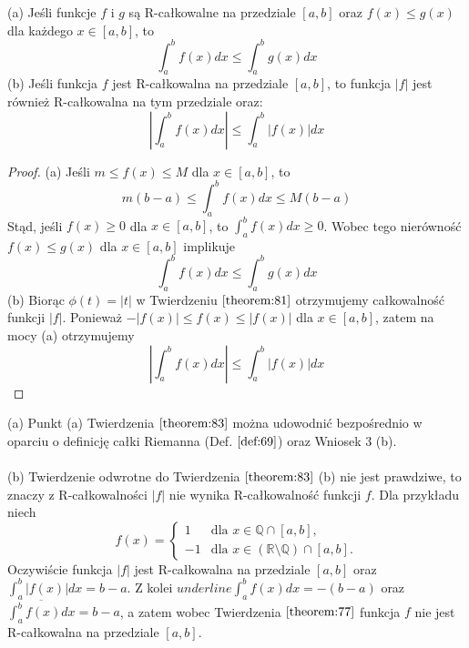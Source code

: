 \documentclass[leqno]{article}
\begin{document}
\begin{justify}
\begin{theorem} 
{
    (a) Jeśli funkcje $f$ i $g$ są R-całkowalne na przedziale $[a,b]$ oraz $f(x) \leqslant g(x)$ dla każdego $x \in [a,b]$, to
    \[
        \int_{a}^{b}f(x)dx \leqslant \int_{a}^{b}g(x)dx
    \]
    (b) Jeśli funkcja $f$ jest R-całkowalna na przedziale $[a,b]$, to funkcja $|f|$ jest również
    R-całkowalna na tym przedziale oraz:
    \[
        \left\vert\int_{a}^{b}f(x)dx\right\vert \leqslant \int_{a}^{b}|f(x)|dx
    \]
}
\end{theorem}
\begin{proof}
    (a) Jeśli $m \leqslant f(x) \leqslant M$ dla $x \in [a,b]$, to
    \[
        m(b-a) \leqslant \int_{a}^{b}f(x)dx \leqslant M(b-a)
    \]
    Stąd, jeśli $f(x) \geqslant 0$ dla $x \in [a,b]$, to $\int_{a}^{b}f(x)dx \geqslant 0$.
    Wobec tego nierówność $f(x) \leqslant g(x)$ dla $x \in [a,b]$ implikuje
    \[
        \int_{a}^{b}f(x)dx \leqslant \int_{a}^{b}g(x)dx
    \]
    (b) Biorąc $\phi(t) = |t|$ w Twierdzeniu $\ref{theorem:81}$ otrzymujemy całkowalność funkcji $|f|$.
    Ponieważ $-|f(x)| \leqslant f(x) \leqslant |f(x)|$ dla $x \in [a,b]$, zatem na mocy (a) otrzymujemy
    \[
        \left\vert\int_{a}^{b}f(x)dx\right\vert \leqslant \int_{a}^{b}|f(x)|dx
    \]
\end{proof}
\begin{uwaga}
    (a) Punkt (a) Twierdzenia $\ref{theorem:83}$ można udowodnić bezpośrednio w oparciu o definicję
    całki Riemanna (Def. $\ref{def:69}$) oraz Wniosek 3 (b). \\
    \\
    \noindent
    (b) Twierdzenie odwrotne do Twierdzenia $\ref{theorem:83}$ (b) nie jest prawdziwe, to znaczy z R-całkowalności
    $|f|$ nie wynika R-całkowalność funkcji $f$. Dla przykładu niech
    \[ f(x) = \begin{cases}
        1 & \text{dla } x \in \mathbb{Q} \cap [a,b], \\
        -1 & \text{dla } x \in  (\mathbb{R \setminus Q}) \cap [a,b].
    \end{cases}
    \]
    Oczywiście funkcja $|f|$ jest R-całkowalna na przedziale $[a,b]$ oraz $\int_{a}^{b}|f(x)|dx = b-a$.
    Z kolei $underline{\int_{a}^{b}f(x)dx} = -(b-a)$ oraz $\overline{\int_{a}^{b}f(x)dx} = b-a$, a zatem
    wobec Twierdzenia $\ref{theorem:77}$ funkcja $f$ nie jest R-całkowalna na przedziale $[a,b]$.
\end{uwaga}


\end{justify}
\end{document}

